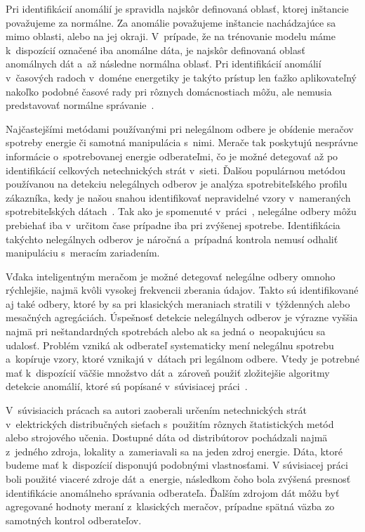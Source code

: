 \documentclass[a4paper,twoside,slovak,12pt,appendix]{article}
\begin{document}
Pri identifikácií anomálií je spravidla najskôr definovaná oblasť, ktorej
inštancie považujeme za normálne. Za anomálie považujeme inštancie nachádzajúce
sa mimo oblasti, alebo na jej okraji. V~prípade, že na trénovanie modelu máme
k~dispozícií označené iba anomálne dáta, je najskôr definovaná oblasť anomálnych
dát a~až následne normálna oblasť. Pri identifikácií anomálií v~časových radoch
v~doméne energetiky je takýto prístup len ťažko aplikovateľný nakoľko podobné
časové rady pri rôznych domácnostiach môžu, ale nemusia predstavovať normálne
správanie~\cite{Spiric2015}.

Najčastejšími metódami používanými pri nelegálnom odbere je obídenie meračov
spotreby energie či samotná manipulácia s~nimi. Merače tak poskytujú nesprávne
informácie o~spotrebovanej energie odberateľmi, čo je možné detegovať až po
identifikácií celkových netechnických strát v~sieti. Ďalšou populárnou metódou
používanou na detekciu nelegálnych odberov je analýza spotrebiteľského
profilu zákazníka, kedy je našou snahou identifikovať nepravidelné vzory
v~nameraných spotrebiteľských dátach~\cite{Sahoo2015}. Tak ako je spomenuté
v~práci~\cite{Depuru2012}, nelegálne odbery môžu prebiehať iba v~určitom čase
prípadne iba pri zvýšenej spotrebe. Identifikácia takýchto nelegálnych odberov
je náročná a~prípadná kontrola nemusí odhaliť manipuláciu s~meracím zariadením.

Vďaka inteligentným meračom je možné detegovať nelegálne odbery omnoho
rýchlejšie, najmä kvôli vysokej frekvencii zberania údajov. Takto sú
identifikované aj také odbery, ktoré by sa pri klasických meraniach stratili
v~týždenných alebo mesačných agregáciách. Úspešnosť detekcie nelegálnych odberov
je výrazne vyššia najmä pri neštandardných spotrebách alebo ak sa jedná
o~neopakujúcu sa udalosť. Problém vzniká ak odberateľ systematicky mení
nelegálnu spotrebu a~kopíruje vzory, ktoré vznikajú v~dátach pri legálnom
odbere. Vtedy je potrebné mať k~dispozícií väčšie množstvo dát a~zároveň použiť
zložitejšie algoritmy detekcie anomálií, ktoré sú popísané v~súvisiacej
práci~\cite{Nikovski2013}.

V~súvisiacich prácach sa autori zaoberali určením netechnických strát
v~elektrických distribučných sieťach s~použitím rôznych štatistických metód
alebo strojového učenia. Dostupné dáta od distribútorov pochádzali najmä
z~jedného zdroja, lokality a~zameriavali sa na jeden zdroj energie. Dáta, ktoré
budeme mať k~dispozícií disponujú podobnými vlastnosťami. V súvisiacej
práci~\cite{Coma-Puig2016} boli použité viaceré zdroje dát a~energie, následkom
čoho bola zvýšená presnosť identifikácie anomálneho správania odberateľa.
Ďalším zdrojom dát môžu byť agregované hodnoty meraní z~klasických meračov,
prípadne spätná väzba zo samotných kontrol odberateľov.
\end{document}
